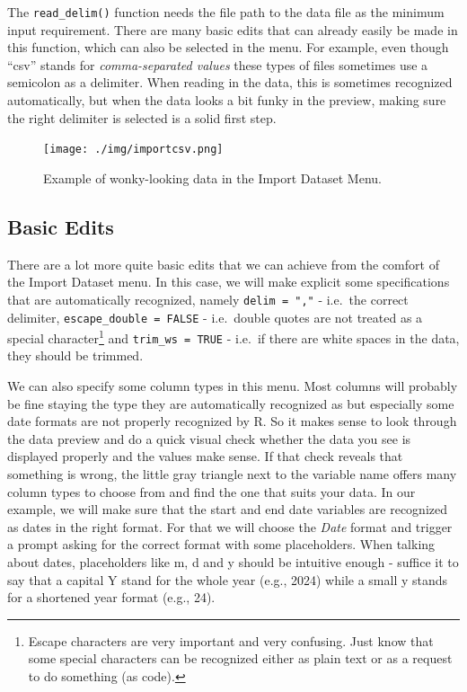 \documentclass[
]{book}
\begin{document}
The \texttt{read\_delim()} function needs the file path to the data file as the minimum input requirement.
There are many basic edits that can already easily be made in this function, which can also be selected in the menu.
For example, even though ``csv'' stands for \emph{comma-separated values} these types of files sometimes use a semicolon as a delimiter.
When reading in the data, this is sometimes recognized automatically, but when the data looks a bit funky in the preview, making sure the right delimiter is selected is a solid first step.

\begin{figure}
\centering
\texttt{[image: ./img/importcsv.png]}
\caption{\label{fig:wonky}Example of wonky-looking data in the Import Dataset Menu.}
\end{figure}

\subsection*{\texorpdfstring{Basic Edits }{Basic Edits }}\label{basic-edits}

There are a lot more quite basic edits that we can achieve from the comfort of the Import Dataset menu.
In this case, we will make explicit some specifications that are automatically recognized, namely \texttt{delim\ =\ ","} - i.e.~the correct delimiter, \texttt{escape\_double\ =\ FALSE} - i.e.~double quotes are not treated as a special character\footnote{Escape characters are very important and very confusing. Just know that some special characters can be recognized either as plain text or as a request to do something (as code).} and \texttt{trim\_ws\ =\ TRUE} - i.e.~if there are white spaces in the data, they should be trimmed.

We can also specify some column types in this menu.
Most columns will probably be fine staying the type they are automatically recognized as but especially some date formats are not properly recognized by R.
So it makes sense to look through the data preview and do a quick visual check whether the data you see is displayed properly and the values make sense.
If that check reveals that something is wrong, the little gray triangle next to the variable name offers many column types to choose from and find the one that suits your data.
In our example, we will make sure that the start and end date variables are recognized as dates in the right format.
For that we will choose the \emph{Date} format and trigger a prompt asking for the correct format with some placeholders.
When talking about dates, placeholders like m, d and y should be intuitive enough - suffice it to say that a capital Y stand for the whole year (e.g., 2024) while a small y stands for a shortened year format (e.g., 24).
\end{document}

